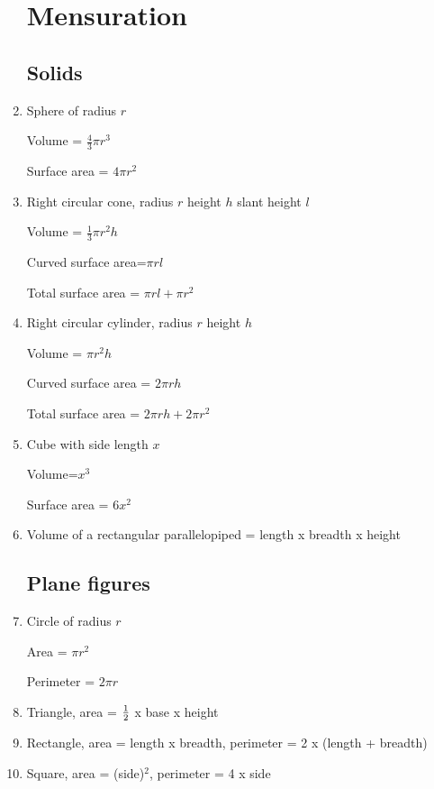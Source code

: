 \documentclass[a4paper]{article}
\begin{document}
\begin{enumerate}
\section{Mensuration}

\subsection{Solids}

\item
Sphere of radius $r$

Volume = $\frac{4}{3}\pi r^3$

Surface area = $4\pi r^2$

\item
Right circular cone, radius $r$ height $h$ slant height $l$

Volume = $\frac{1}{3} \pi r^2 h$

Curved surface area=$\pi rl$

Total surface area = $\pi rl + \pi r^2$

\item
Right circular cylinder, radius $r$ height $h$

Volume = $\pi r^2 h$

Curved surface area = $2\pi rh$

Total surface area = $2\pi rh + 2\pi r^2$

\item
Cube with side length $x$

Volume=$x^3$

Surface area = $6x^2$

\item
Volume of a rectangular parallelopiped = length x breadth x height

\subsection{Plane figures}

\item
Circle of radius $r$

Area = $\pi r^2$

Perimeter = $2\pi r$

\item
Triangle, area = $\frac{1}{2}$ x base x height

\item
Rectangle, area = length x breadth, perimeter = 2 x (length + breadth)

\item
Square, area = (side)$^2$, perimeter = 4 x side


\end{enumerate}
\end{document}
